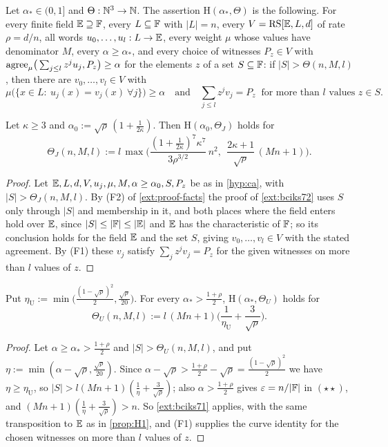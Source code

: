 \begin{definition}\label{hyp:ca}
Let $\alpha_*\in(0,1]$ and $\Theta:\mathbb{N}^3\to\mathbb{N}$. The assertion $\mathrm H(\alpha_*,\Theta)$ is the
following. For every finite field $\mathbb{E}\supseteq\mathbb{F}$, every $L\subseteq\mathbb{F}$ with $|L|=n$, every
$V=\mathrm{RS}[\mathbb{E},L,d]$ of rate $\rho=d/n$, all words $u_0,\dots,u_l:L\to\mathbb{E}$, every weight $\mu$ whose
values have denominator $M$, every $\alpha\ge\alpha_*$, and every choice of witnesses $P_z\in V$
with $\mathrm{agree}_\mu\big(\sum_{j\le l}z^ju_j,P_z\big)\ge\alpha$ for the elements $z$ of a set
$S\subseteq\mathbb{F}$: if $|S|>\Theta(n,M,l)$, then there are $v_0,\dots,v_l\in V$ with
\[
\mu\big(\{x\in L:\ u_j(x)=v_j(x)\ \forall j\}\big)\ge\alpha
\quad\text{and}\quad
\textstyle\sum_{j\le l}z^jv_j=P_z\ \text{ for more than }l\text{ values }z\in S .
\]
\end{definition}

\begin{proposition}\label{prop:H1}
Let $\kappa\ge3$ and $\alpha_0:=\sqrt\rho\,(1+\frac1{2\kappa})$. Then
$\mathrm H(\alpha_0,\Theta_J)$ holds for
\[
\Theta_J(n,M,l):=l\,\max\Big(\frac{(1+\frac1{2\kappa})^7\kappa^7}{3\rho^{3/2}}\,n^2,\ \
\frac{2\kappa+1}{\sqrt\rho}\,(Mn+1)\Big).
\]
\end{proposition}

\begin{proof}
Let $\mathbb{E},L,d,V,u_j,\mu,M,\alpha\ge\alpha_0,S,P_z$ be as in \cref{hyp:ca}, with
$|S|>\Theta_J(n,M,l)$. By (F2) of \cref{ext:proof-facts} the proof of \cref{ext:bciks72} uses $S$
only through $|S|$ and membership in it, and both places where the field enters hold over $\mathbb{E}$,
since $|S|\le|\mathbb{F}|\le|\mathbb{E}|$ and $\mathbb{E}$ has the characteristic of $\mathbb{F}$; so its conclusion holds for the
field $\mathbb{E}$ and the set $S$, giving $v_0,\dots,v_l\in V$ with the stated agreement. By (F1) these
$v_j$ satisfy $\sum_jz^jv_j=P_z$ for the given witnesses on more than $l$ values of $z$.
\end{proof}

\begin{proposition}\label{prop:H2}
Put $\eta_{\mathrm U}:=\min\big(\frac{(1-\sqrt\rho)^2}2,\frac{\sqrt\rho}{20}\big)$. For every
$\alpha_*>\frac{1+\rho}2$, $\mathrm H(\alpha_*,\Theta_U)$ holds for
\[
\Theta_U(n,M,l):=l\,(Mn+1)\Big(\frac1{\eta_{\mathrm U}}+\frac3{\sqrt\rho}\Big).
\]
\end{proposition}

\begin{proof}
Let $\alpha\ge\alpha_*>\frac{1+\rho}2$ and $|S|>\Theta_U(n,M,l)$, and put
$\eta:=\min(\alpha-\sqrt\rho,\frac{\sqrt\rho}{20})$. Since
$\alpha-\sqrt\rho>\frac{1+\rho}2-\sqrt\rho=\frac{(1-\sqrt\rho)^2}2$ we have $\eta\ge\eta_{\mathrm U}$,
so $|S|>l(Mn+1)(\frac1\eta+\frac3{\sqrt\rho})$; also $\alpha>\frac{1+\rho}2$ gives
$\varepsilon=n/|\mathbb{F}|$ in $(\star\star)$, and $(Mn+1)(\frac1\eta+\frac3{\sqrt\rho})>n$. So
\cref{ext:bciks71} applies, with the same transposition to $\mathbb{E}$ as in \cref{prop:H1}, and (F1)
supplies the curve identity for the chosen witnesses on more than $l$ values of $z$.
\end{proof}

